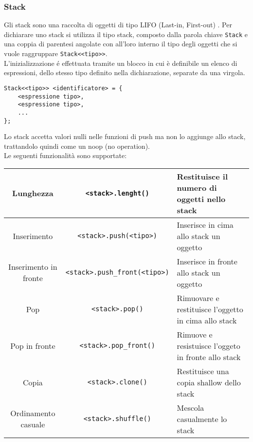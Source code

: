 \newpage

\subsubsection{Stack}
Gli stack sono una raccolta di oggetti di tipo LIFO (Last-in, First-out) \cite{CSharpLang}.
Per dichiarare uno stack si utilizza il tipo stack, composto dalla parola chiave \lstinline|Stack|
e una coppia di parentesi angolate con all'loro interno il tipo degli oggetti che si vuole raggruppare
\lstinline|Stack<<tipo>>|. \\
L'inizializzazione é effettuata tramite un blocco in cui è definibile un elenco di espressioni,
dello stesso tipo definito nella dichiarazione, separate da una virgola.
\begin{lstlisting}
Stack<<tipo>> <identificatore> = {
    <espressione tipo>,
    <espressione tipo>,
    ...
};
\end{lstlisting}
Lo stack accetta valori nulli nelle funzioni di push ma non lo aggiunge allo stack, trattandolo quindi
come un noop (no operation). \\
Le seguenti funzionalità sono supportate:
\begin{tabular}{|c|c|p{5cm}|}
    \hline
    Lunghezza & \lstinline|<stack>.lenght()|& Restituisce il numero di oggetti nello stack \\
    \hline
    Inserimento & \lstinline|<stack>.push(<tipo>)| & Inserisce in cima allo stack un oggetto \\
    \hline
    Inserimento in fronte& \lstinline|<stack>.push_front(<tipo>)| & Inserisce in fronte allo stack un oggetto \\
    \hline
    Pop & \lstinline|<stack>.pop()| & Rimuovare e restituisce l'oggetto in cima allo stack\\
    \hline
    Pop in fronte& \lstinline|<stack>.pop_front()| & Rimuove e resistuisce l'oggeto in fronte allo stack\\
    \hline
    Copia & \lstinline|<stack>.clone()| & Restituisce una copia shallow dello stack \\
    \hline
    Ordinamento casuale & \lstinline|<stack>.shuffle()| & Mescola casualmente lo stack\\
    \hline
\end{tabular}

